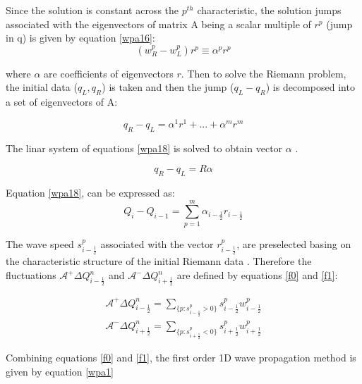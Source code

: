 \documentclass[12pt,a4paper]{article}
\begin{document}
	\noindent Since the solution is constant across the $p^{th}$ characteristic, the solution jumps associated with the eigenvectors of matrix A being a scalar multiple of $r^{p}$ (jump in q) is given by equation \eqref{wpa16}:
	\begin{equation}
		(w_{R}^{p} - w_{L}^{p}) r^{p} \equiv \alpha^{p}r^{p}
		\label{wpa16}
	\end{equation}

	\noindent where $\alpha$ are coefficients of eigenvectors $r$. Then to solve the Riemann problem, the initial data ($q_{L},q_{R}$) is taken and then the jump ($q_{L} - q_{R}$) is decomposed into a set of  eigenvectors of A:
	
	\begin{equation}
		q_{R} - q_{L} = \alpha^{1}r^{1} + ... + \alpha^{m}r^{m}
		\label{wpa17}
	\end{equation}
	
	\noindent The linar system of equations \eqref{wpa18}  is solved to obtain vector $\alpha$ .
	
	\begin{equation}
		q_{R} - q_{L} = R \alpha
		\label{wpa18}
	\end{equation}
	
	\noindent Equation \eqref{wpa18}, can be expressed as:
		\begin{equation}
		Q_{i} -  Q_{i-1} = \sum_{p=1}^{m}  \alpha_{i-\frac{1}{2}} r_{i-\frac{1}{2}}
		\label{wpa19}
	\end{equation}

	\noindent The wave speed $s_{i-\frac{1}{2}}^{p}$ associated with the vector $r_{i-\frac{1}{2}}^{p}$, are preselected basing on the characteristic structure of the initial Riemann data \cite{ge:2008}. Therefore the fluctuations $\mathcal{A^{+}}\Delta Q_{i-\frac{1}{2}}^{n}$  and $\mathcal{A^{-}}\Delta Q_{i+\frac{1}{2}}^{n} $ are defined by equations \eqref{f0} and \eqref{f1}:
   
   \begin{eqnarray}
   	\mathcal{A^{+}}\Delta Q_{i-\frac{1}{2}}^{n} = \sum_{\{ p:s_{i-\frac{1}{2}}^{p}>0\}} s_{i-\frac{1}{2}}^{p} w_{i-\frac{1}{2}}^{p}
   	\label{f0}\\
   		\mathcal{A^{-}}\Delta Q_{i+\frac{1}{2}}^{n} = \sum_{\{ p:s_{i+\frac{1}{2}}^{p}<0\}} s_{i+\frac{1}{2}}^{p} w_{i+\frac{1}{2}}^{p}
   		\label{f1}
   \end{eqnarray}
   
   
   \noindent Combining equations \eqref{f0} and \eqref{f1}, the  first order 1D  wave propagation method is given by equation \eqref{wpa1}
	
\end{document}
